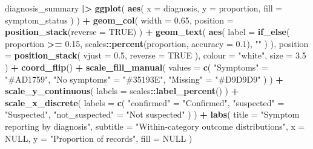 \documentclass[
  british,
]{article}
\newenvironment{Shaded}{\begin{snugshade}}{\end{snugshade}}
\newcommand{\AttributeTok}[1]{\textcolor[rgb]{0.13,0.29,0.53}{#1}}
\newcommand{\ConstantTok}[1]{\textcolor[rgb]{0.56,0.35,0.01}{#1}}
\newcommand{\FloatTok}[1]{\textcolor[rgb]{0.00,0.00,0.81}{#1}}
\newcommand{\FunctionTok}[1]{\textcolor[rgb]{0.13,0.29,0.53}{\textbf{#1}}}
\newcommand{\NormalTok}[1]{#1}
\newcommand{\OtherTok}[1]{\textcolor[rgb]{0.56,0.35,0.01}{#1}}
\newcommand{\SpecialCharTok}[1]{\textcolor[rgb]{0.81,0.36,0.00}{\textbf{#1}}}
\newcommand{\StringTok}[1]{\textcolor[rgb]{0.31,0.60,0.02}{#1}}
\begin{document}
\begin{Shaded}
\begin{Highlighting}[]
\NormalTok{diagnosis\_summary }\SpecialCharTok{|\textgreater{}}
  \FunctionTok{ggplot}\NormalTok{(}
    \FunctionTok{aes}\NormalTok{(}
      \AttributeTok{x =}\NormalTok{ diagnosis,}
      \AttributeTok{y =}\NormalTok{ proportion,}
      \AttributeTok{fill =}\NormalTok{ symptom\_status}
\NormalTok{    )}
\NormalTok{  ) }\SpecialCharTok{+}
  \FunctionTok{geom\_col}\NormalTok{(}
    \AttributeTok{width =} \FloatTok{0.65}\NormalTok{,}
    \AttributeTok{position =} \FunctionTok{position\_stack}\NormalTok{(}\AttributeTok{reverse =} \ConstantTok{TRUE}\NormalTok{)}
\NormalTok{  ) }\SpecialCharTok{+}
  \FunctionTok{geom\_text}\NormalTok{(}
    \FunctionTok{aes}\NormalTok{(}
      \AttributeTok{label =} \FunctionTok{if\_else}\NormalTok{(}
\NormalTok{        proportion }\SpecialCharTok{\textgreater{}=} \FloatTok{0.15}\NormalTok{,}
\NormalTok{        scales}\SpecialCharTok{::}\FunctionTok{percent}\NormalTok{(proportion, }\AttributeTok{accuracy =} \FloatTok{0.1}\NormalTok{),}
        \StringTok{""}
\NormalTok{      )}
\NormalTok{    ),}
    \AttributeTok{position =} \FunctionTok{position\_stack}\NormalTok{(}
      \AttributeTok{vjust =} \FloatTok{0.5}\NormalTok{,}
      \AttributeTok{reverse =} \ConstantTok{TRUE}
\NormalTok{    ),}
    \AttributeTok{colour =} \StringTok{"white"}\NormalTok{,}
    \AttributeTok{size =} \FloatTok{3.5}
\NormalTok{  ) }\SpecialCharTok{+}
  \FunctionTok{coord\_flip}\NormalTok{() }\SpecialCharTok{+}
  \FunctionTok{scale\_fill\_manual}\NormalTok{(}
    \AttributeTok{values =} \FunctionTok{c}\NormalTok{(}
      \StringTok{"Symptoms"} \OtherTok{=} \StringTok{"\#AD1759"}\NormalTok{,}
      \StringTok{"No symptoms"} \OtherTok{=} \StringTok{"\#35193E"}\NormalTok{,}
      \StringTok{"Missing"} \OtherTok{=} \StringTok{"\#D9D9D9"}
\NormalTok{    )}
\NormalTok{  ) }\SpecialCharTok{+}
  \FunctionTok{scale\_y\_continuous}\NormalTok{(}
    \AttributeTok{labels =}\NormalTok{ scales}\SpecialCharTok{::}\FunctionTok{label\_percent}\NormalTok{()}
\NormalTok{  ) }\SpecialCharTok{+}
  \FunctionTok{scale\_x\_discrete}\NormalTok{(}
    \AttributeTok{labels =} \FunctionTok{c}\NormalTok{(}
      \StringTok{"confirmed"} \OtherTok{=} \StringTok{"Confirmed"}\NormalTok{,}
      \StringTok{"suspected"} \OtherTok{=} \StringTok{"Suspected"}\NormalTok{,}
      \StringTok{"not\_suspected"} \OtherTok{=} \StringTok{"Not suspected"}
\NormalTok{    )}
\NormalTok{  ) }\SpecialCharTok{+}
  \FunctionTok{labs}\NormalTok{(}
    \AttributeTok{title =} \StringTok{"Symptom reporting by diagnosis"}\NormalTok{,}
    \AttributeTok{subtitle =} \StringTok{"Within{-}category outcome distributions"}\NormalTok{,}
    \AttributeTok{x =} \ConstantTok{NULL}\NormalTok{,}
    \AttributeTok{y =} \StringTok{"Proportion of records"}\NormalTok{,}
    \AttributeTok{fill =} \ConstantTok{NULL}
\NormalTok{  )}
\end{Highlighting}
\end{Shaded}
\end{document}
